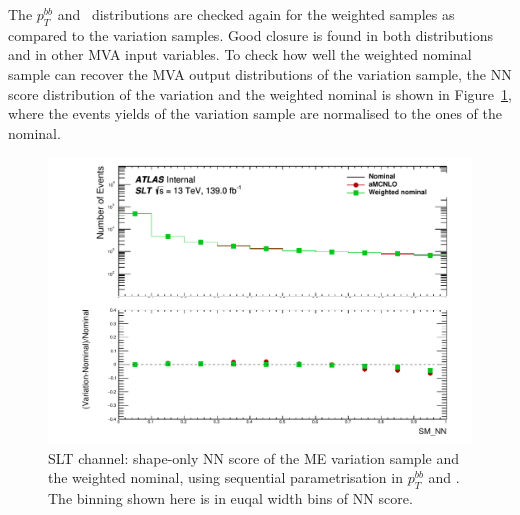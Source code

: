 The $p_T^{bb}$ and \met\ distributions are checked again for the 
weighted samples as compared to the variation samples. 
Good closure is found in both distributions and in other MVA 
input variables. 
To check how well the weighted nominal sample can recover the MVA output distributions
of the variation sample, the NN score distribution of the variation 
and the weighted nominal is shown in Figure~\ref{fig:ttbarsyst_lephad_amc_NN},
where the events yields of the variation sample are 
normalised to the ones of the nominal.

\begin{figure}
\centering
\includegraphics[width=.49\textwidth]{ figures/lephad_modelling_systs/SLT/aMCNLO/Hist_and_ratio_SM_NN_Norm.pdf}
\caption{SLT channel: shape-only NN score of the ME variation sample and the weighted nominal, using sequential parametrisation
in $p_T^{bb}$ and \met.
The binning shown here is in euqal width bins of NN score. }
\label{fig:ttbarsyst_lephad_amc_NN}
\end{figure}
  
